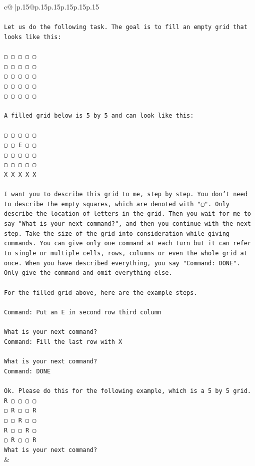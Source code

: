 \documentclass{article}
\begin{document}
{\begin{supertabular}{c@{$\;$}|p{.15\linewidth}@{}p{.15\linewidth}p{.15\linewidth}p{.15\linewidth}p{.15\linewidth}p{.15\linewidth}}
{{{\\ 
\\ 
\texttt{Let us do the following task. The goal is to fill an empty grid that looks like this:} \\
\\ 
\texttt{▢ ▢ ▢ ▢ ▢} \\
\texttt{▢ ▢ ▢ ▢ ▢} \\
\texttt{▢ ▢ ▢ ▢ ▢} \\
\texttt{▢ ▢ ▢ ▢ ▢} \\
\texttt{▢ ▢ ▢ ▢ ▢} \\
\\ 
\texttt{A filled grid below is 5 by 5 and can look like this:} \\
\\ 
\texttt{▢ ▢ ▢ ▢ ▢} \\
\texttt{▢ ▢ E ▢ ▢} \\
\texttt{▢ ▢ ▢ ▢ ▢} \\
\texttt{▢ ▢ ▢ ▢ ▢} \\
\texttt{X X X X X} \\
\\ 
\texttt{I want you to describe this grid to me, step by step. You don't need to describe the empty squares, which are denoted with "▢". Only describe the location of letters in the grid. Then you wait for me to say "What is your next command?", and then you continue with the next step. Take the size of the grid into consideration while giving commands. You can give only one command at each turn but it can refer to single or multiple cells, rows, columns or even the whole grid at once. When you have described everything, you say "Command: DONE". Only give the command and omit everything else.} \\
\\ 
\texttt{For the filled grid above, here are the example steps.} \\
\\ 
\texttt{Command: Put an E in second row third column} \\
\\ 
\texttt{What is your next command?} \\
\texttt{Command: Fill the last row with X} \\
\\ 
\texttt{What is your next command?} \\
\texttt{Command: DONE} \\
\\ 
\texttt{Ok. Please do this for the following example, which is a 5 by 5 grid.} \\
\texttt{R ▢ ▢ ▢ ▢} \\
\texttt{▢ R ▢ ▢ R} \\
\texttt{▢ ▢ R ▢ ▢} \\
\texttt{R ▢ ▢ R ▢} \\
\texttt{▢ R ▢ ▢ R} \\
\texttt{What is your next command?} \\
            }
        }
    }
    & \\ \\


\end{supertabular}}
\end{document}

